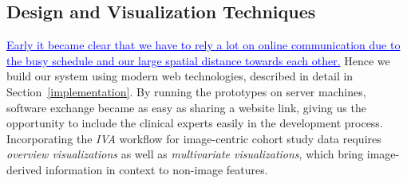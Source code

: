 \documentclass[journal]{style/vgtc} 			          %
\newcommand{\add}[1]{\textcolor{blue}{\uline{#1}}}
\begin{document}
\subsection{Design and Visualization Techniques} \label{Structure and Workflow}
\add{Early it became clear that we have to rely a lot on online communication due to the busy schedule and our large spatial distance towards each other.}
%
Hence we build our system using modern web technologies, described in detail in Section~\ref{implementation}.
%
By running the prototypes on server machines, software exchange became as easy as sharing a website link, giving us the opportunity to include the clinical experts easily in the development process.
%
Incorporating the \emph{IVA} workflow for image-centric cohort study data requires \emph{overview visualizations} as well as \emph{multivariate visualizations}, which bring image-derived information in context to non-image features.
\end{document}
